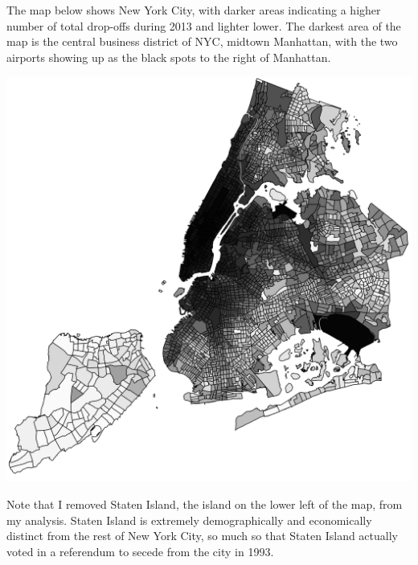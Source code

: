 \documentclass[11pt]{article}
\begin{document}
The map below shows New York City, with darker areas indicating a higher number of total drop-offs during 2013 and lighter lower.
The darkest area of the map is the central business district of NYC, midtown Manhattan, with the two airports showing up as the black spots to the right of Manhattan.

\begin{centering}
  \includegraphics[scale=0.25, natwidth=2362, natheight=2362]{TotalDropoffsGreyscaletemp.png}
\end{centering}


Note that I removed Staten Island, the island on the lower left of the map, from my analysis. Staten Island is extremely demographically and economically distinct from the rest of New York City, so much so that Staten Island actually voted in a referendum to secede from the city in 1993. 
\end{document}
